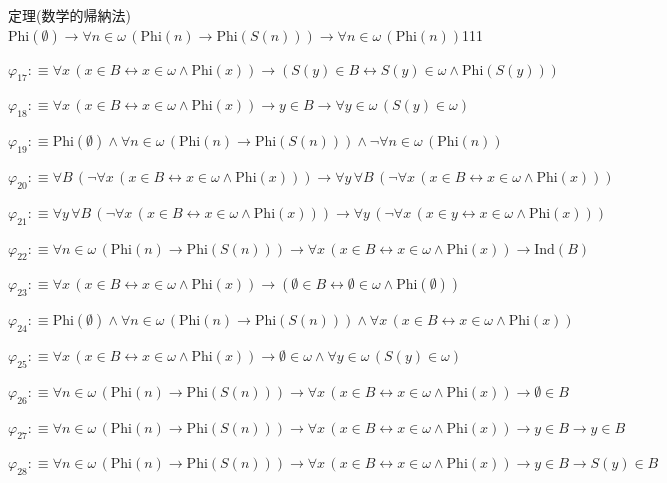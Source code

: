 \begin{fullproof}{定理(数学的帰納法)}{$\mathrm{Phi}(\emptyset) \to \forall n \in \omega\,(\mathrm{Phi}(n) \to \mathrm{Phi}(S(n))) \to \forall n \in \omega\,(\mathrm{Phi}(n))$}{111}
\begin{abbrevlist}
\item $\varphi_{17} :\equiv \forall x\,(x \in B \leftrightarrow x \in \omega \land \mathrm{Phi}(x)) \to (S(y) \in B \leftrightarrow S(y) \in \omega \land \mathrm{Phi}(S(y)))$
\item $\varphi_{18} :\equiv \forall x\,(x \in B \leftrightarrow x \in \omega \land \mathrm{Phi}(x)) \to y \in B \to \forall y \in \omega\,(S(y) \in \omega)$
\item $\varphi_{19} :\equiv \mathrm{Phi}(\emptyset) \land \forall n \in \omega\,(\mathrm{Phi}(n) \to \mathrm{Phi}(S(n))) \land \neg \forall n \in \omega\,(\mathrm{Phi}(n))$
\item $\varphi_{20} :\equiv \forall B\,(\neg \forall x\,(x \in B \leftrightarrow x \in \omega \land \mathrm{Phi}(x))) \to \forall y\,\forall B\,(\neg \forall x\,(x \in B \leftrightarrow x \in \omega \land \mathrm{Phi}(x)))$
\item $\varphi_{21} :\equiv \forall y\,\forall B\,(\neg \forall x\,(x \in B \leftrightarrow x \in \omega \land \mathrm{Phi}(x))) \to \forall y\,(\neg \forall x\,(x \in y \leftrightarrow x \in \omega \land \mathrm{Phi}(x)))$
\item $\varphi_{22} :\equiv \forall n \in \omega\,(\mathrm{Phi}(n) \to \mathrm{Phi}(S(n))) \to \forall x\,(x \in B \leftrightarrow x \in \omega \land \mathrm{Phi}(x)) \to \mathrm{Ind}(B)$
\item $\varphi_{23} :\equiv \forall x\,(x \in B \leftrightarrow x \in \omega \land \mathrm{Phi}(x)) \to (\emptyset \in B \leftrightarrow \emptyset \in \omega \land \mathrm{Phi}(\emptyset))$
\item $\varphi_{24} :\equiv \mathrm{Phi}(\emptyset) \land \forall n \in \omega\,(\mathrm{Phi}(n) \to \mathrm{Phi}(S(n))) \land \forall x\,(x \in B \leftrightarrow x \in \omega \land \mathrm{Phi}(x))$
\item $\varphi_{25} :\equiv \forall x\,(x \in B \leftrightarrow x \in \omega \land \mathrm{Phi}(x)) \to \emptyset \in \omega \land \forall y \in \omega\,(S(y) \in \omega)$
\item $\varphi_{26} :\equiv \forall n \in \omega\,(\mathrm{Phi}(n) \to \mathrm{Phi}(S(n))) \to \forall x\,(x \in B \leftrightarrow x \in \omega \land \mathrm{Phi}(x)) \to \emptyset \in B$
\item $\varphi_{27} :\equiv \forall n \in \omega\,(\mathrm{Phi}(n) \to \mathrm{Phi}(S(n))) \to \forall x\,(x \in B \leftrightarrow x \in \omega \land \mathrm{Phi}(x)) \to y \in B \to y \in B$
\item $\varphi_{28} :\equiv \forall n \in \omega\,(\mathrm{Phi}(n) \to \mathrm{Phi}(S(n))) \to \forall x\,(x \in B \leftrightarrow x \in \omega \land \mathrm{Phi}(x)) \to y \in B \to S(y) \in B$

\end{abbrevlist}
\end{fullproof}
